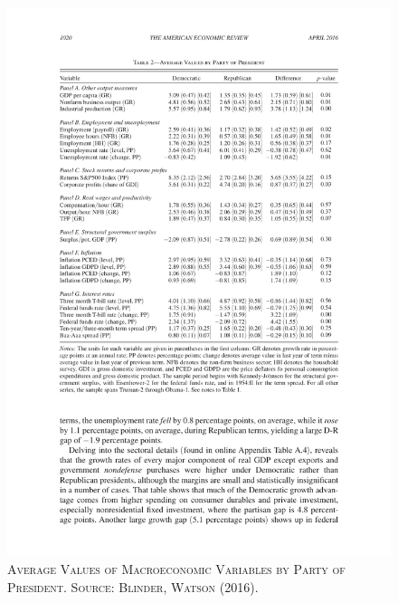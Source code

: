 \documentclass[]{book}
\begin{document}
\begin{figure}

{\centering \includegraphics[width=0.8\linewidth,height=0.8\textheight]{figures/BlinderWatson2016/table2} 

}

\caption{\textsc{Average Values of Macroeconomic
Variables by Party of President. Source: Blinder, Watson (2016).}}\label{fig:BlinderWatson2016-table2}
\end{figure}
\end{document}
